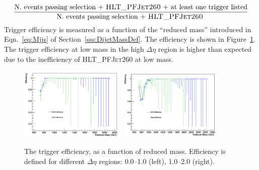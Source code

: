 \begin{equation}
\frac{\text{N. events passing selection + \textsc{HLT\_PFJet260} + at least one trigger listed}}{\text{N. events passing selection + \textsc{HLT\_PFJet260} }}
\end{equation}
Trigger efficiency is measured as a function of the ``reduced mass'' introduced in Eqn.~\ref{eq:Mjjs} of Section~\ref{sss:DijetMassDef}. The efficiency is shown in Figure~\ref{fig:trigeEffvsMjj_JetHT_DetaBins}. The trigger efficiency at low mass in the high $\Delta\eta$ region is higher than expected due to the inefficiency of \textsc{HLT\_PFJet260} at low mass. 

\begin{figure}[h]
  \begin{center}  
    \includegraphics[width=0.45\textwidth]{F5/trigefDeta0v2.pdf} 
    \includegraphics[width=0.45\textwidth]{F5/trigefDeta1v2.pdf} 

  \end{center}
  \caption{The trigger efficiency, as a function of reduced mass. Efficiency is defined for different $\Delta\eta$ regions: 0.0--1.0 (left), 1.0--2.0 (right).}%
  \label{fig:trigeEffvsMjj_JetHT_DetaBins}
\end{figure}


